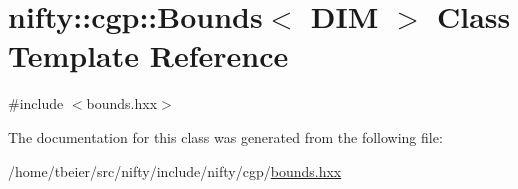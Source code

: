 \hypertarget{classnifty_1_1cgp_1_1Bounds}{}\section{nifty\+:\+:cgp\+:\+:Bounds$<$ D\+IM $>$ Class Template Reference}
\label{classnifty_1_1cgp_1_1Bounds}


{\ttfamily \#include $<$bounds.\+hxx$>$}



The documentation for this class was generated from the following file\+:\begin{DoxyCompactItemize}
\item 
/home/tbeier/src/nifty/include/nifty/cgp/\hyperlink{bounds_8hxx}{bounds.\+hxx}\end{DoxyCompactItemize}
